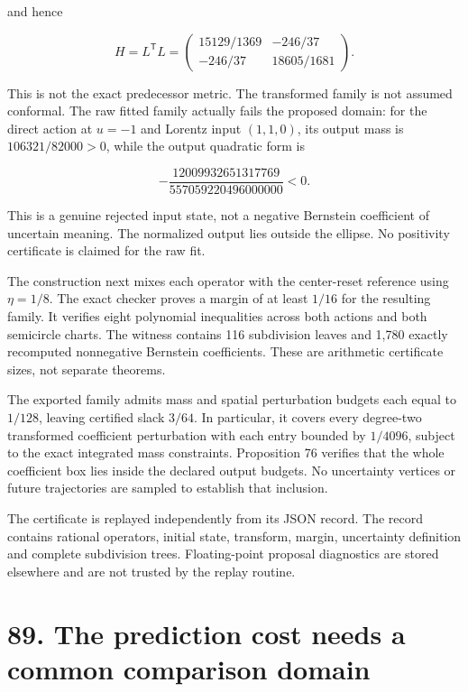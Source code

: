 \documentclass[11pt,letterpaper]{article}
\begin{document}
and hence

\[
\boxed{
H=L^{\mathsf T}L=
\begin{pmatrix}15129/1369&-246/37\\-246/37&18605/1681\end{pmatrix}.
}
\]

This is not the exact predecessor metric. The transformed family is not
assumed conformal. The raw fitted family actually fails the proposed
domain: for the direct action at \(u=-1\) and Lorentz input \((1,1,0)\),
its output mass is \(106321/82000>0\), while the output quadratic form
is

\[
-\frac{12009932651317769}{557059220496000000}<0.
\]

This is a genuine rejected input state, not a negative Bernstein
coefficient of uncertain meaning. The normalized output lies outside the
ellipse. No positivity certificate is claimed for the raw fit.

The construction next mixes each operator with the center-reset
reference using \(\eta=1/8\). The exact checker proves a margin of at
least \(1/16\) for the resulting family. It verifies eight polynomial
inequalities across both actions and both semicircle charts. The witness
contains 116 subdivision leaves and 1,780 exactly recomputed nonnegative
Bernstein coefficients. These are arithmetic certificate sizes, not
separate theorems.

The exported family admits mass and spatial perturbation budgets each
equal to \(1/128\), leaving certified slack \(3/64\). In particular, it
covers every degree-two transformed coefficient perturbation with each
entry bounded by \(1/4096\), subject to the exact integrated mass
constraints. Proposition 76 verifies that the whole coefficient box lies
inside the declared output budgets. No uncertainty vertices or future
trajectories are sampled to establish that inclusion.

The certificate is replayed independently from its JSON record. The
record contains rational operators, initial state, transform, margin,
uncertainty definition and complete subdivision trees. Floating-point
proposal diagnostics are stored elsewhere and are not trusted by the
replay routine.

\section{89. The prediction cost needs a common comparison
domain}\label{the-prediction-cost-needs-a-common-comparison-domain}
\end{document}
